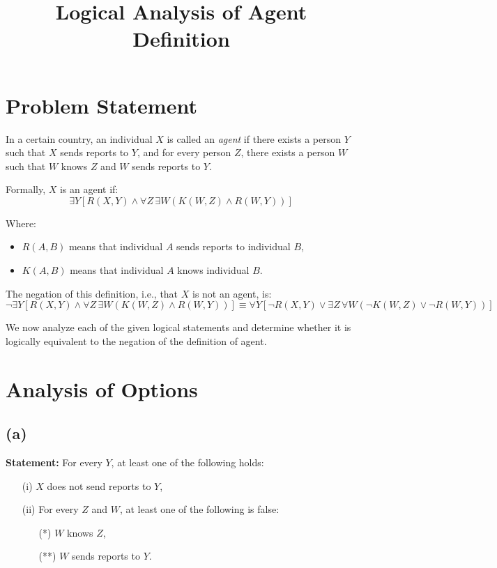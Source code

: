 \documentclass[12pt]{article}
\title{Logical Analysis of Agent Definition}
\author{}
\date{}
\begin{document}
\maketitle

\section{Problem Statement}

In a certain country, an individual $X$ is called an \emph{agent} if there exists a person $Y$ such that $X$ sends reports to $Y$, and for every person $Z$, there exists a person $W$ such that $W$ knows $Z$ and $W$ sends reports to $Y$.

Formally, $X$ is an agent if:
\begin{equation*}
    \exists Y \left[ R(X,Y) \land \forall Z \, \exists W \left( K(W,Z) \land R(W,Y) \right) \right]
\end{equation*}

Where:
\begin{itemize}
    \item $R(A,B)$ means that individual $A$ sends reports to individual $B$,
    \item $K(A,B)$ means that individual $A$ knows individual $B$.
\end{itemize}

The negation of this definition, i.e., that $X$ is not an agent, is:
\begin{equation*}
    \neg \exists Y \left[ R(X,Y) \land \forall Z \, \exists W (K(W,Z) \land R(W,Y)) \right] 
    \equiv \forall Y \left[ \neg R(X,Y) \lor \exists Z \, \forall W \left( \neg K(W,Z) \lor \neg R(W,Y) \right) \right]
\end{equation*}

We now analyze each of the given logical statements and determine whether it is logically equivalent to the negation of the definition of agent.

\section{Analysis of Options}

\subsection*{(a)}
\textbf{Statement:} For every $Y$, at least one of the following holds:
\begin{itemize}
    \item[(i)] $X$ does not send reports to $Y$,
    \item[(ii)] For every $Z$ and $W$, at least one of the following is false:
    \begin{itemize}
        \item[(*)] $W$ knows $Z$,
        \item[(**)] $W$ sends reports to $Y$.
    \end{itemize}
\end{itemize}
\end{document}
